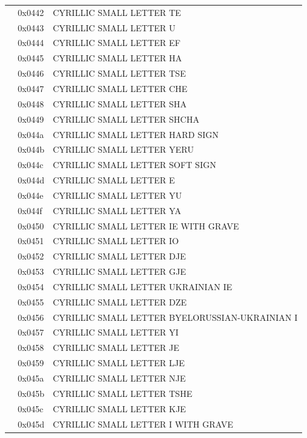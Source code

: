 \documentclass[12pt, twoside]{article}
\begin{document}
\begin{longtable}{L{1.0cm} L{2.0cm} >{\footnotesize}L{10cm}}
&0x0442&CYRILLIC SMALL LETTER TE\\
&0x0443&CYRILLIC SMALL LETTER U\\
&0x0444&CYRILLIC SMALL LETTER EF\\
&0x0445&CYRILLIC SMALL LETTER HA\\
&0x0446&CYRILLIC SMALL LETTER TSE\\
&0x0447&CYRILLIC SMALL LETTER CHE\\
&0x0448&CYRILLIC SMALL LETTER SHA\\
&0x0449&CYRILLIC SMALL LETTER SHCHA\\
&0x044a&CYRILLIC SMALL LETTER HARD SIGN\\
&0x044b&CYRILLIC SMALL LETTER YERU\\
&0x044c&CYRILLIC SMALL LETTER SOFT SIGN\\
&0x044d&CYRILLIC SMALL LETTER E\\
&0x044e&CYRILLIC SMALL LETTER YU\\
&0x044f&CYRILLIC SMALL LETTER YA\\
&0x0450&CYRILLIC SMALL LETTER IE WITH GRAVE\\
&0x0451&CYRILLIC SMALL LETTER IO\\
&0x0452&CYRILLIC SMALL LETTER DJE\\
&0x0453&CYRILLIC SMALL LETTER GJE\\
&0x0454&CYRILLIC SMALL LETTER UKRAINIAN IE\\
&0x0455&CYRILLIC SMALL LETTER DZE\\
&0x0456&CYRILLIC SMALL LETTER BYELORUSSIAN-UKRAINIAN I\\
&0x0457&CYRILLIC SMALL LETTER YI\\
&0x0458&CYRILLIC SMALL LETTER JE\\
&0x0459&CYRILLIC SMALL LETTER LJE\\
&0x045a&CYRILLIC SMALL LETTER NJE\\
&0x045b&CYRILLIC SMALL LETTER TSHE\\
&0x045c&CYRILLIC SMALL LETTER KJE\\
&0x045d&CYRILLIC SMALL LETTER I WITH GRAVE\\

\end{longtable}
\end{document}

